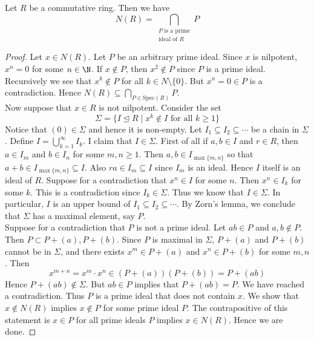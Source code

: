 \documentclass[a4paper]{article}
\begin{document}
\begin{prp}{}{} Let $R$ be a commutative ring. Then we have $$N(R)=\bigcap_{\substack{P\text{ is a prime}\\\text{ideal of }R}}P$$ 
\begin{proof}
Let $x\in N(R)$. Let $P$ be an arbitrary prime ideal. Since $x$ is nilpotent, $x^n=0$ for some $n\in\N$. If $x\notin P$, then $x^2\notin P$ since $P$ is a prime ideal. Recursively we see that $x^k\notin P$ for all $k\in N\setminus\{0\}$. But $x^n=0\in P$ is a contradiction. Hence $N(R)\subseteq\bigcap_{P\in\text{Spec}(R)}P$. \\

Now suppose that $x\in R$ is not nilpotent. Consider the set $$\Sigma=\{I\trianglelefteq R\;|\;x^k\notin I\text{ for all }k\geq 1\}$$ Notice that $(0)\in\Sigma$ and hence it is non-empty. Let $I_1\subseteq I_2\subseteq\cdots$ be a chain in $\Sigma$. Define $I=\bigcup_{k=1}^\infty I_k$. I claim that $I\in\Sigma$. First of all if $a,b\in I$ and $r\in R$, then $a\in I_m$ and $b\in I_n$ for some $m,n\geq 1$. Then $a,b\in I_{\max\{m,n\}}$ so that $a+b\in I_{\max\{m,n\}}\subseteq I$. Also $ra\in I_m\subseteq I$ since $I_m$ is an ideal. Hence $I$ itself is an ideal of $R$. Suppose for a contradiction that $x^n\in I$ for some $n$. Then $x^n\in I_k$ for some $k$. This is a contradiction since $I_k\in\Sigma$. Thus we know that $I\in\Sigma$. In particular, $I$ is an upper bound of $I_1\subseteq I_2\subseteq\cdots$. By Zorn's lemma, we conclude that $\Sigma$ has a maximal element, say $P$. \\

Suppose for a contradiction that $P$ is not a prime ideal. Let $ab\in P$ and $a,b\notin P$. Then $P\subset P+(a),P+(b)$. Since $P$ is maximal in $\Sigma$, $P+(a)$ and $P+(b)$ cannot be in $\Sigma$, and there exists $x^m\in P+(a)$ and $x^n\in P+(b)$ for some $m,n$. Then $$x^{m+n}=x^m\cdot x^n\in (P+(a))(P+(b))=P+(ab)$$ Hence $P+(ab)\notin\Sigma$. But $ab\in P$ implies that $P+(ab)=P$. We have reached a contradiction. Thus $P$ is a prime ideal that does not contain $x$. We show that $x\notin N(R)$ implies $x\notin P$ for some prime ideal $P$. The contrapositive of this statement is $x\in P$ for all prime ideals $P$ implies $x\in N(R)$. Hence we are done. 
\end{proof}
\end{prp}
\end{document}
